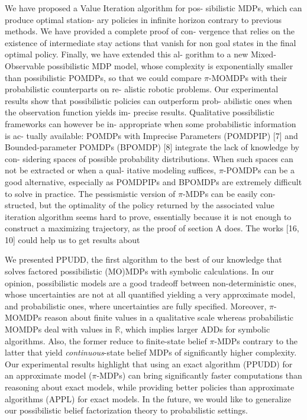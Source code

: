 We have proposed a Value Iteration algorithm for pos-
sibilistic  MDPs,  which  can  produce  optimal  station-
ary  policies  in  infinite  horizon  contrary  to  previous
methods.  We have provided a complete proof of con-
vergence  that  relies  on  the  existence  of  intermediate
stay actions that vanish for non goal states in the final optimal policy. 
Finally, we have extended this al-
gorithm to a new Mixed-Observable possibilistic MDP
model, whose complexity is exponentially smaller than
possibilistic  POMDPs,  so  that  we  could  compare
$\pi$-MOMDPs with their probabilistic counterparts on re-
alistic  robotic  problems.    Our  experimental  results
show  that  possibilistic  policies  can  outperform  prob-
abilistic ones when the observation function yields im-
precise results.
Qualitative possibilistic frameworks can however be in-
appropriate when some probabilistic information is ac-
tually available:  POMDPs with Imprecise Parameters
(POMDPIP)  [7]  and  Bounded-parameter  POMDPs
(BPOMDP) [8] integrate the lack of knowledge by con-
sidering  spaces  of  possible  probability  distributions.
When such spaces can not be extracted or when a qual-
itative  modeling  suffices, $\pi$-POMDPs  can  be  a  good
alternative, especially as POMDPIPs and BPOMDPs
are  extremely  difficult to solve in practice.
The pessismistic version of $\pi$-MDPs can be easily con-
structed, but the optimality of the policy returned by
the associated value iteration algorithm seems hard to
prove, essentially because it is not enough to construct
a maximizing trajectory, as the proof of section A does.
The works [16, 10] could help us to get results about


We
presented PPUDD, the first algorithm to the best of our knowledge that 
solves factored possibilistic (MO)MDPs with symbolic calculations. In our opinion,
possibilistic models are a good tradeoff between non-deterministic ones, whose
uncertainties are not at all quantified yielding a very approximate model, and
probabilistic ones, where uncertainties are fully specified. Moreover,
$\pi$-MOMDPs reason about finite values in a qualitative scale whereas
probabilistic MOMDPs deal with values in $\mathbb{R}$, which implies larger ADDs
for symbolic algorithms. Also, the former reduce to finite-state belief
$\pi$-MDPs contrary to the latter that yield \emph{continuous}-state belief MDPs
of significantly higher complexity. Our experimental results highlight that using an
exact algorithm (PPUDD) for an approximate model ($\pi$-MDPs) can bring significantly faster computations
than reasoning about exact models, while providing better
policies than approximate algorithms (APPL) for exact models. In the future, we
would like to generalize our possibilistic belief factorization theory to
probabilistic settings. %


